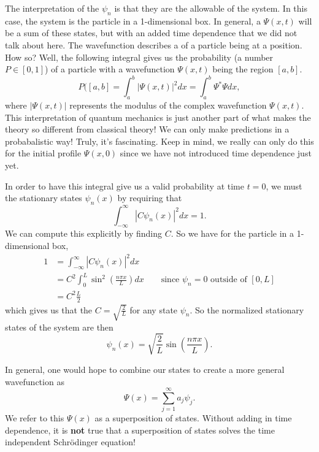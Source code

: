 The interpretation of the $\psi_n$ is that they are the allowable  of the system. In this case, the system is the particle in a 1-dimensional box. In general, a  $\Psi(x,t)$ will be a sum of these states, but with an added time dependence that we did not talk about here. The wavefunction describes a  of a particle being at a position.  How so? Well, the following integral gives us the probability (a number $P\in [0,1]$) of a particle with a wavefunction $\Psi(x,t)$ being the region $[a,b]$.
\[
P([a,b]=\int_a^b |\Psi(x,t)|^2 dx=\int_a^b \Psi^* \Psi dx,
\]
where $|\Psi(x,t) |$ represents the modulus of the complex wavefunction $\Psi(x,t)$. This interpretation of quantum mechanics is just another part of what makes the theory so different from classical theory! We can only make predictions in a probabalistic way! Truly, it's fascinating. Keep in mind, we really can only do this for the initial profile $\Psi(x,0)$ since we have not introduced time dependence just yet.

In order to have this integral give us a valid probability at time $t=0$, we must  the stationary states $\psi_n(x)$ by requiring that
\[
\int_{-\infty}^\infty |C\psi_n(x)|^2dx=1.
\]
We can compute this explicitly by finding $C$. So we have for the particle in a 1-dimensional box,
\begin{align*}
    1&= \int_{-\infty}^\infty |C\psi_n(x)|^2dx\\
    &= C^2\int_{0}^L \sin^2\left(\frac{n\pi x}{L}\right)dx \qquad \textrm{since $\psi_n=0$ outside of $[0,L]$}\\
    &= C^2 \frac{L}{2}
\end{align*}
which gives us that the  $C=\sqrt{\frac{2}{L}}$ for any state $\psi_n$. So the normalized stationary states of the system are then
\[
\boxed{\psi_n(x) = \sqrt{\frac{2}{L}}\sin\left(\frac{n\pi x}{L}\right).}
\]

In general, one would hope to combine our states to create a more general wavefunction as
\[
\Psi(x) = \sum_{j=1}^\infty a_j \psi_j.
\]
We refer to this $\Psi(x)$ as a superposition of states.  Without adding in time dependence, it is \textbf{not} true that a superposition of states solves the time independent Schr\"odinger equation!

